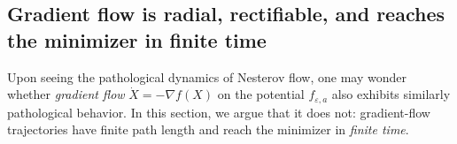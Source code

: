 \documentclass{article}
\newtheorem{theorem}{Theorem}[section]
\theoremstyle{remark}
\newcommand{\dd}{\,\mathrm{d}}
\begin{document}





\subsection{Gradient flow is radial, rectifiable, and reaches the minimizer in finite time}\label{sec:gradient-flow}

Upon seeing the pathological dynamics of Nesterov flow, one may wonder whether \emph{gradient flow} $\dot{X}=-\nabla f(X)$ on the potential $f_{\varepsilon,a}$ also exhibits similarly pathological behavior. In this section, we argue that it does not: gradient-flow trajectories have finite path length and reach the minimizer in \emph{finite time}.
\end{document}

